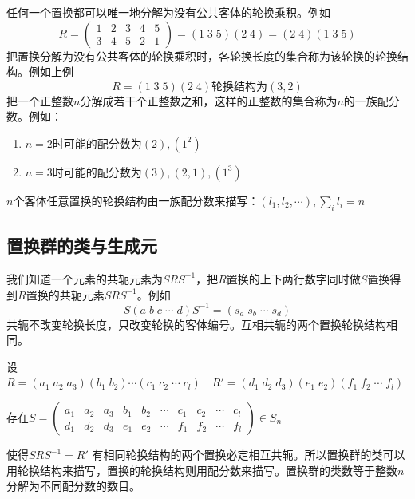 \documentclass[12pt]{article}
\begin{document}
    任何一个置换都可以唯一地分解为没有公共客体的轮换乘积。例如
    \begin{equation*}
        R=\begin{pmatrix}
            1&2&3&4&5\\
            3&4&5&2&1
        \end{pmatrix}=(1\;3\;5)(2\;4)=(2\;4)(1\;3\;5)
    \end{equation*}
    把置换分解为没有公共客体的轮换乘积时，各轮换长度的集合称为该轮换的轮换结构。例如上例
    \begin{equation*}
        R=(1\;3\;5)(2\;4)\text{轮换结构为$(3,2)$}
    \end{equation*}
    把一个正整数$n$分解成若干个正整数之和，这样的正整数的集合称为$n$的一族配分数。例如：
    \begin{enumerate}
        \item $n=2$时可能的配分数为$(2),(1^2)$
        \item $n=3$时可能的配分数为$(3),(2,1),(1^3)$
    \end{enumerate}
$n$个客体任意置换的轮换结构由一族配分数来描写：$(l_1,l_2,\cdots),\sum_il_i=n$
\subsection{置换群的类与生成元}
我们知道一个元素的共轭元素为$SRS^{-1}$，把$R$置换的上下两行数字同时做$S$置换得到$R$置换的共轭元素$SRS^{-1}$。例如
\begin{equation*}
    S(a\;b\;c\;\cdots\;d)S^{-1}=(s_a\;s_b\;\cdots\;s_d)
\end{equation*}
共轭不改变轮换长度，只改变轮换的客体编号。互相共轭的两个置换轮换结构相同。

设$R=(a_1\;a_2\;a_3)(b_1\;b_2)\cdots(c_1\;c_2\;\cdots\;c_l)\quad R'=(d_1\;d_2\;d_3)(e_1\;e_2)(f_1\;f_2\;\cdots\;f_l)$

存在$S=\begin{pmatrix}
    a_1&a_2&a_3&b_1&b_2&\cdots&c_1&c_2&\cdots&c_l\\
    d_1&d_2&d_3&e_1&e_2&\cdots&f_1&f_2&\cdots&f_l
\end{pmatrix}\in S_n$

使得$SRS^{-1}=R'$
有相同轮换结构的两个置换必定相互共轭。所以置换群的类可以用轮换结构来描写，置换的轮换结构则用配分数来描写。置换群的类数等于整数$n$分解为不同配分数的数目。
\end{document}
